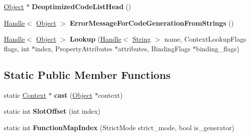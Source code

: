 \begin{DoxyCompactItemize}
\item 
\hypertarget{classv8_1_1internal_1_1_context_acd39dde9e75a0164771dff091f81eddd}{}\hyperlink{classv8_1_1internal_1_1_object}{Object} $\ast$ {\bfseries Deoptimized\+Code\+List\+Head} ()\label{classv8_1_1internal_1_1_context_acd39dde9e75a0164771dff091f81eddd}

\item 
\hypertarget{classv8_1_1internal_1_1_context_a74c1859a9dab38be17728aaaa4d33285}{}\hyperlink{classv8_1_1internal_1_1_handle}{Handle}$<$ \hyperlink{classv8_1_1internal_1_1_object}{Object} $>$ {\bfseries Error\+Message\+For\+Code\+Generation\+From\+Strings} ()\label{classv8_1_1internal_1_1_context_a74c1859a9dab38be17728aaaa4d33285}

\item 
\hypertarget{classv8_1_1internal_1_1_context_a87f11b1b843d961340a289812875d128}{}\hyperlink{classv8_1_1internal_1_1_handle}{Handle}$<$ \hyperlink{classv8_1_1internal_1_1_object}{Object} $>$ {\bfseries Lookup} (\hyperlink{classv8_1_1internal_1_1_handle}{Handle}$<$ \hyperlink{classv8_1_1internal_1_1_string}{String} $>$ name, Context\+Lookup\+Flags flags, int $\ast$index, Property\+Attributes $\ast$attributes, Binding\+Flags $\ast$binding\+\_\+flags)\label{classv8_1_1internal_1_1_context_a87f11b1b843d961340a289812875d128}

\end{DoxyCompactItemize}
\subsection*{Static Public Member Functions}
\begin{DoxyCompactItemize}
\item 
\hypertarget{classv8_1_1internal_1_1_context_a1bbe293c82de1e308d583e2b292b3433}{}static \hyperlink{classv8_1_1internal_1_1_context}{Context} $\ast$ {\bfseries cast} (\hyperlink{classv8_1_1internal_1_1_object}{Object} $\ast$context)\label{classv8_1_1internal_1_1_context_a1bbe293c82de1e308d583e2b292b3433}

\item 
\hypertarget{classv8_1_1internal_1_1_context_ac0da2ec757ff29e9e8b41d2febce8656}{}static int {\bfseries Slot\+Offset} (int index)\label{classv8_1_1internal_1_1_context_ac0da2ec757ff29e9e8b41d2febce8656}

\item 
\hypertarget{classv8_1_1internal_1_1_context_a888dec47c913b3b09d3d6a5ac82e71cd}{}static int {\bfseries Function\+Map\+Index} (Strict\+Mode strict\+\_\+mode, bool is\+\_\+generator)\label{classv8_1_1internal_1_1_context_a888dec47c913b3b09d3d6a5ac82e71cd}

\end{DoxyCompactItemize}
